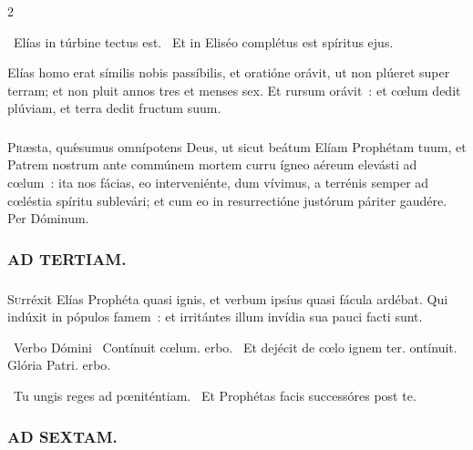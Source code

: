 \documentclass[9pt,twoside]{extarticle}
\begin{document}
\begin{multicols}{2}
{\begin{tightlist}
\item {}~Elías in túrbine tectus est. ~Et in Eliséo complétus est spíritus ejus.
\item {} Elías homo erat símilis nobis passíbilis, et oratióne orávit, ut non plúeret super terram; et non pluit annos tres et menses sex. Et rursum orávit~: et cœlum dedit plúviam, et terra dedit fructum suum.
\end{tightlist}

\subsubsection*{\center {}}
\lettrine{P}ræsta, quǽsumus omnípotens Deus, ut sicut beátum Elíam Prophétam tuum, et Patrem nostrum ante commúnem mortem curru ígneo aéreum elevásti ad cœlum~: ita nos fácias, eo interveniénte, dum vívimus, a terrénis semper ad cœléstia spíritu sublevári; et cum eo in resurrectióne justórum páriter gaudére. Per Dóminum.

\subsubsection*{\center \textsc{AD TERTIAM.}}
\subsubsection*{}
\lettrine{S}urréxit Elías Prophéta quasi ignis, et verbum ipsíus quasi fácula ardébat. Qui indúxit in pópulos famem~: et irritántes illum invídia sua pauci facti sunt.

\begin{tightlist}{}
\item {}~Verbo Dómini \textred{*}~Contínuit cœlum. erbo. ~Et dejécit de cœlo ignem ter. ontínuit. Glória Patri. erbo.
\item {}~Tu ungis reges ad pœniténtiam. ~Et Prophétas facis successóres post te.
\end{tightlist}

\subsubsection*{\center \textsc{AD SEXTAM.}}
}
\end{multicols}
\end{document}
